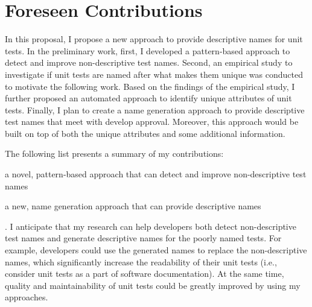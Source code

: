 \section{Foreseen Contributions}
\label{sec:contributions}

In this proposal, I propose a new approach to provide descriptive names for unit tests.
%
In the preliminary work, first, I developed a pattern-based approach to detect and improve non-descriptive test names.
%
Second, an empirical study to investigate if unit tests are named after what makes them unique was conducted to motivate the following work.
%
Based on the findings of the empirical study, I further proposed an automated approach to identify unique attributes of unit tests.
%
Finally, I plan to create a name generation approach to provide descriptive test names that meet with develop approval.
%
Moreover, this approach would be built on top of both the unique attributes and some additional information.


The following list presents a summary of my contributions:
\begin{enumerate*}
    \item a novel, pattern-based approach that can detect and improve non-descriptive test names
    \item a new, name generation approach that can provide descriptive names
\end{enumerate*}.
%
I anticipate that my research can help developers both detect non-descriptive test names and generate descriptive names for the poorly named tests.
%
For example, developers could use the generated names to replace the non-descriptive names, which significantly increase the readability of their unit tests (i.e., consider unit tests as a part of software documentation).
%
At the same time, quality and maintainability of unit tests could be greatly improved by using my approaches.